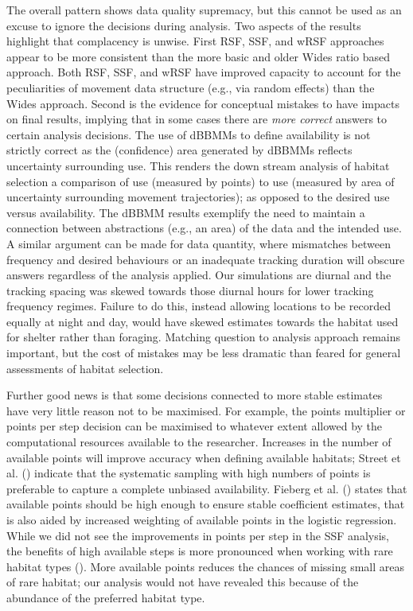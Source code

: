 \documentclass[10pt,a4paper]{article}
\begin{document}
The overall pattern shows data quality supremacy, but this cannot be used as an excuse to ignore the decisions during analysis.
Two aspects of the results highlight that complacency is unwise.
First RSF, SSF, and wRSF approaches appear to be more consistent than the more basic and older Wides ratio based approach.
Both RSF, SSF, and wRSF have improved capacity to account for the peculiarities of movement data structure (e.g., via random effects) than the Wides approach.
Second is the evidence for conceptual mistakes to have impacts on final results, implying that in some cases there are \emph{more correct} answers to certain analysis decisions.
The use of dBBMMs to define availability is not strictly correct as the (confidence) area generated by dBBMMs reflects uncertainty surrounding use.
This renders the down stream analysis of habitat selection a comparison of use (measured by points) to use (measured by area of uncertainty surrounding movement trajectories); as opposed to the desired use versus availability.
The dBBMM results exemplify the need to maintain a connection between abstractions (e.g., an area) of the data and the intended use.
A similar argument can be made for data quantity, where mismatches between frequency and desired behaviours or an inadequate tracking duration will obscure answers regardless of the analysis applied.
Our simulations are diurnal and the tracking spacing was skewed towards those diurnal hours for lower tracking frequency regimes.
Failure to do this, instead allowing locations to be recorded equally at night and day, would have skewed estimates towards the habitat used for shelter rather than foraging.
Matching question to analysis approach remains important, but the cost of mistakes may be less dramatic than feared for general assessments of habitat selection.

Further good news is that some decisions connected to more stable estimates have very little reason not to be maximised.
For example, the points multiplier or points per step decision can be maximised to whatever extent allowed by the computational resources available to the researcher.
Increases in the number of available points will improve accuracy when defining available habitats; Street et al. () indicate that the systematic sampling with high numbers of points is preferable to capture a complete unbiased availability.
Fieberg et al. () states that available points should be high enough to ensure stable coefficient estimates, that is also aided by increased weighting of available points in the logistic regression.
While we did not see the improvements in points per step in the SSF analysis, the benefits of high available steps is more pronounced when working with rare habitat types ().
More available points reduces the chances of missing small areas of rare habitat; our analysis would not have revealed this because of the abundance of the preferred habitat type.
\end{document}
